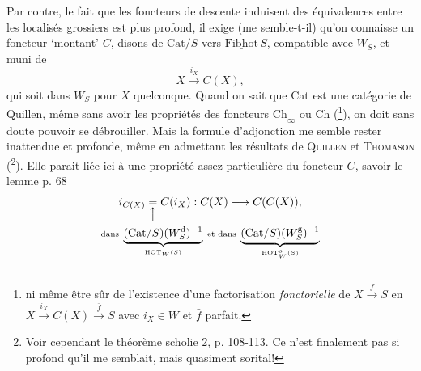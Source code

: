 \documentclass[11pt]{article}
\newcommand{\printedpage}[1]{\marginpar{\footnotesize p.~#1}}
\newcommand{\msp}[1]{\marginpar{\footnotesize [#1]}}
\newcommand{\usl}[1]{\underline{\mathrm{#1}}}
\begin{document}
\printedpage{52}
Par contre, le fait que les foncteurs de descente induisent des équivalences entre les localisés grossiers est plus profond, il exige (me semble-t-il) qu’on connaisse un foncteur ‘montant’ $C$, disons de $\mathrm{Cat}/S$ vers $\usl{Fibhot}\,S$, compatible avec $W_S$, et muni de
\[
X \xrightarrow{i_X} C(X),
\]
qui soit dans $W_S$ pour $X$ quelconque. Quand on sait que Cat est une catégorie de Quillen, même sans avoir les propriétés des foncteurs $\usl{Ch}_\infty$ ou $\usl{Ch}$ (\footnote[52]{ni même être sûr de l’existence d’une factorisation \textit{fonctorielle} de $X \xrightarrow{f} S$ en $X \xrightarrow{i_X} C(X) \xrightarrow{\bar{f}} S$ avec $i_X \in W$ et $\bar{f}$ parfait.}), on doit sans doute
\msp{page 82}
pouvoir se débrouiller. Mais la formule d’adjonction me semble rester inattendue et profonde, même en admettant les résultats de \textsc{Quillen} et \textsc{Thomason} (\footnote[53]{Voir cependant le théorème scholie 2, p. 108-113. Ce n’est finalement pas si profond qu’il me semblait, mais quasiment sorital!}). Elle parait liée ici à une propriété assez particulière du foncteur $C$, savoir le lemme p. 68
\[
\begin{gathered}
i_{C(X)} \underset{\big\uparrow}{=} C(i_X) : C(X) \longrightarrow C(C(X)),\\
\scriptstyle \text{dans } \underbrace{(\mathrm{Cat}/S)(W_S^{\mathrm{d}})^{-1}}_{\mathrm{HOT}_W(S)} \text{ et dans } \underbrace{(\mathrm{Cat}/S)(W_S^{\mathrm{g}})^{-1}}_{\mathrm{HOT}^{o}_{W}(S)}
\end{gathered}
\]
\end{document}

